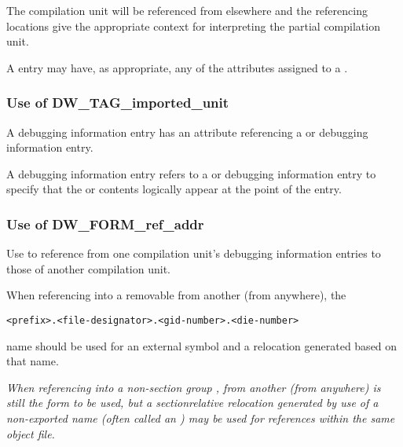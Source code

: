 The  compilation unit will be referenced
from elsewhere and the referencing locations give the
appropriate context for interpreting the partial compilation
unit.

A  entry may have, as appropriate, any of
the attributes assigned to a .


\subsubsection{Use of DW\_TAG\_imported\_unit}

A  debugging information entry has an
 attribute referencing a  or
 debugging information entry.

A  debugging information entry refers
to a 
 or 
 debugging
information entry to specify that the 
 or
 contents logically appear at the point
of the 
 entry.


\subsubsection{Use of DW\_FORM\_ref\_addr}

Use 
 to reference from one compilation
unit's debugging information entries to those of another
compilation unit.

When referencing into a removable 
\dotdebuginfo{}
from another \dotdebuginfo{} (from anywhere), the
\begin{alltt}
    <prefix>.<file-designator>.<gid-number>.<die-number>
\end{alltt}
name should be used for an external symbol and a relocation
generated based on that name.

\textit{When referencing into a 
non-section group 
\dotdebuginfo{},
from another \dotdebuginfo{} (from anywhere) 
 is
still the form to be used, but a section\dash relative relocation
generated by use of a non-exported name (often called an
) may be used for references within the
same object file.}

